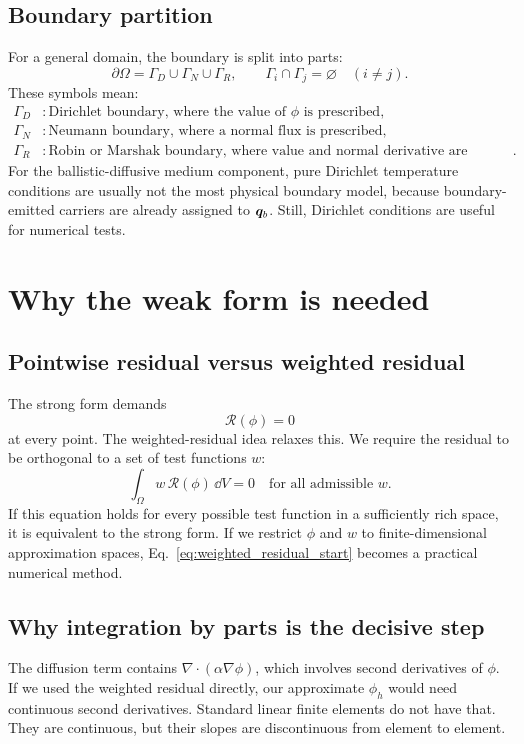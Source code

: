 \documentclass[11pt]{article}
\begin{document}
\subsection{Boundary partition}
For a general domain, the boundary is split into parts:
\begin{equation}
    \partial\Omega=\Gamma_D\cup\Gamma_N\cup\Gamma_R,
    \qquad
    \Gamma_i\cap\Gamma_j=\varnothing\quad (i\ne j).
\end{equation}
These symbols mean:
\begin{align}
    \Gamma_D &: \text{Dirichlet boundary, where the value of }\phi\text{ is prescribed},\\
    \Gamma_N &: \text{Neumann boundary, where a normal flux is prescribed},\\
    \Gamma_R &: \text{Robin or Marshak boundary, where value and normal derivative are related}.
\end{align}
For the ballistic-diffusive medium component, pure Dirichlet temperature conditions are usually not the most physical boundary model, because boundary-emitted carriers are already assigned to \(\bm{q}_b\). Still, Dirichlet conditions are useful for numerical tests.

\section{Why the weak form is needed}
\subsection{Pointwise residual versus weighted residual}
The strong form demands
\begin{equation}
    \mathcal{R}(\phi)=0
\end{equation}
at every point. The weighted-residual idea relaxes this. We require the residual to be orthogonal to a set of test functions \(w\):
\begin{equation}
    \int_\Omega w\,\mathcal{R}(\phi)\,\dd V=0
    \quad \text{for all admissible }w.
    \label{eq:weighted_residual_start}
\end{equation}
If this equation holds for every possible test function in a sufficiently rich space, it is equivalent to the strong form. If we restrict \(\phi\) and \(w\) to finite-dimensional approximation spaces, Eq.~\eqref{eq:weighted_residual_start} becomes a practical numerical method.

\subsection{Why integration by parts is the decisive step}
The diffusion term contains \(\nabla\cdot(\alpha\nabla\phi)\), which involves second derivatives of \(\phi\). If we used the weighted residual directly, our approximate \(\phi_h\) would need continuous second derivatives. Standard linear finite elements do not have that. They are continuous, but their slopes are discontinuous from element to element.
\end{document}
